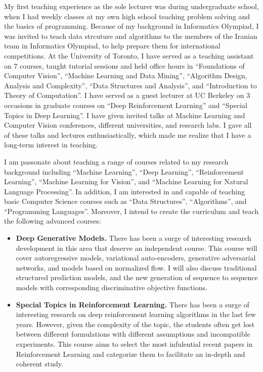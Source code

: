 \documentclass[a4paper, 10pt]{article}
\begin{document}
My first teaching experience as the sole lecturer was during
undergraduate school, when I had weekly classes at my own high school
teaching problem solving and the basics of programming. Because of my
background in Informatics Olympiad, I was invited to teach data
strcuture and algorithms to the members of the Iranian team in
Informatics Olympiad, to help prepare them for international
competitions. At the University of Toronto, I have served as a
teaching assistant on $7$ courses, taught tutorial sessions and held
office hours in ``Foundations of Computer Vision'', ``Machine Learning
and Data Mining'', ``Algorithm Design, Analysis and Complexity'',
``Data Structures and Analysis'', and ``Introduction to Theory of
Computation''. I have served as a guest lecturer at UC Berkeley on $3$
occasions in graduate courses on ``Deep Reinforcement Learning'' and
``Special Topics in Deep Learning''. I have given invited talks at
Machine Learning and Computer Vision conferences, different
universities, and research labs. I gave all of these talks and
lectures enthusiastically, which made me realize that I have a
long-term interest in teaching.

I am passonate about teaching a range of courses related to my
research background including ``Machine Learning'', ``Deep Learning'',
``Reinforcement Learning'', ``Machine Learning for Vision'', and
``Machine Learning for Natural Language Processing''. In addition, I
am interested in and capable of teaching basic Computer Science
courses such as ``Data Structures'', ``Algorithms'', and ``Programming
Languages''. Moreover, I intend to create the curriculum and teach the
following advanced courses:
\vspace*{-.1cm}
\begin{itemize}
\item {\bf Deep Generative Models.} There has been a surge of
  interesting research development in this area that deserve an
  independent course. This course will cover autoregressive models,
  variational auto-encoders, generative adversarial networks, and
  models based on normalized flow. I will also discuss traditional
  structured prediction models, and the new generation of sequence to
  sequence models with corresponding discriminative objective functions.
\vspace*{-.1cm}
\item {\bf Special Topics in Reinforcement Learning.} There has been a
  surge of interesting research on deep reinforcement learning
  algorithms in the last few years. However, given the complexity of
  the topic, the students often get lost between different
  formulations with different assumptions and incompatible
  experiments.  This course aims to select the most infulential recent
  papers in Reinforcement Learning and categorize them to facilitate
  an in-depth and coherent study.
\end{itemize}
\end{document}
